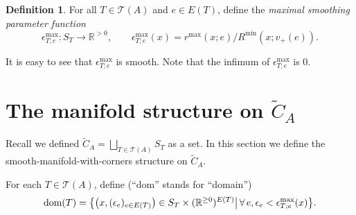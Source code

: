\documentclass[11pt]{article}
\theoremstyle{definition}
\newtheorem{dfn}[thm]{Definition}
\theoremstyle{remark}
\def\wt#1{\widetilde{#1}}
\def\R{\mathbb{R}}
\def\cT{\mathcal{T}}
\def\dom{{\tn{dom}}}
\def\tn#1{\textnormal{#1}}
\begin{document}
\begin{dfn}
For all $T\in\cT(A)$ and $e\in E(T)$, define the {\it maximal smoothing parameter function}
$$\epsilon^{\max}_{T;e}:S_T\longrightarrow \R^{>0},\qquad \epsilon^{\max}_{T;e}(x)=r^{\max}(x;e)\big/R^{\min}(x;v_+(e)).$$
\end{dfn}
It is easy to see that $\epsilon^{\max}_{T;e}$ is smooth. Note that the infimum of $\epsilon^{\max}_{T;e}$ is 0. 





\section{The manifold structure on \texorpdfstring{$\wt{C}_A$}{the big configuration space}}
\label{conftilde_sec}

Recall we defined $\wt{C}_A=\bigsqcup_{T\in\cT(A)}S_T$ as a set. 
In this section we define the smooth-manifold-with-corners structure on $\wt{C}_A$. 


For each $T\in\cT(A)$, define (``dom'' stands for ``domain'')
$$\dom(T)=\big\{\big(x,(\epsilon_e)_{e\in E(T)}\big)\in S_T\times(\R^{\ge0})^{E(T)}\big|\,\forall\,e, \epsilon_e<\epsilon^{\max}_{T;e}(x)\big\}.$$
\end{document}
